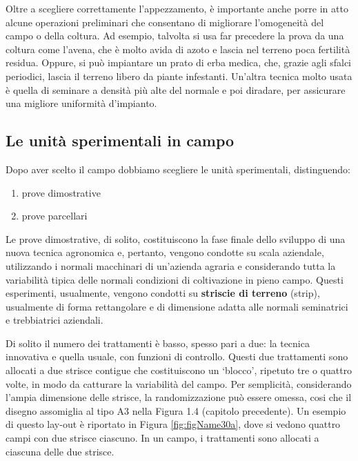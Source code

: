 \documentclass[a4paper,12pt,oneside]{book}
\providecommand{\tightlist}{%
  \setlength{\itemsep}{0pt}\setlength{\parskip}{0pt}}
\begin{document}
Oltre a scegliere correttamente l'appezzamento, è importante anche porre in atto alcune operazioni preliminari che consentano di migliorare l'omogeneità del campo o della coltura. Ad esempio, talvolta si usa far precedere la prova da una coltura come l'avena, che è molto avida di azoto e lascia nel terreno poca fertilità residua. Oppure, si può impiantare un prato di erba medica, che, grazie agli sfalci periodici, lascia il terreno libero da piante infestanti. Un'altra tecnica molto usata è quella di seminare a densità più alte del normale e poi diradare, per assicurare una migliore uniformità d'impianto.

\hypertarget{le-unituxe0-sperimentali-in-campo}{%
\subsection{Le unità sperimentali in campo}\label{le-unituxe0-sperimentali-in-campo}}

Dopo aver scelto il campo dobbiamo scegliere le unità sperimentali, distinguendo:

\begin{enumerate}
\def\labelenumi{\arabic{enumi}.}
\tightlist
\item
  prove dimostrative
\item
  prove parcellari
\end{enumerate}

Le prove dimostrative, di solito, costituiscono la fase finale dello sviluppo di una nuova tecnica agronomica e, pertanto, vengono condotte su scala aziendale, utilizzando i normali macchinari di un'azienda agraria e considerando tutta la variabilità tipica delle normali condizioni di coltivazione in pieno campo. Questi esperimenti, usualmente, vengono condotti su \textbf{striscie di terreno} (strip), usualmente di forma rettangolare e di dimensione adatta alle normali seminatrici e trebbiatrici aziendali.

Di solito il numero dei trattamenti è basso, spesso pari a due: la tecnica innovativa e quella usuale, con funzioni di controllo. Questi due trattamenti sono allocati a due strisce contigue che costituiscono un `blocco', ripetuto tre o quattro volte, in modo da catturare la variabilità del campo. Per semplicità, considerando l'ampia dimensione delle strisce, la randomizzazione può essere omessa, cosi che il disegno assomiglia al tipo A3 nella Figura 1.4 (capitolo precedente). Un esempio di questo lay-out è riportato in Figura \ref{fig:figName30a}, dove si vedono quattro campi con due strisce ciascuno. In un campo, i trattamenti sono allocati a ciascuna delle due strisce.
\end{document}
